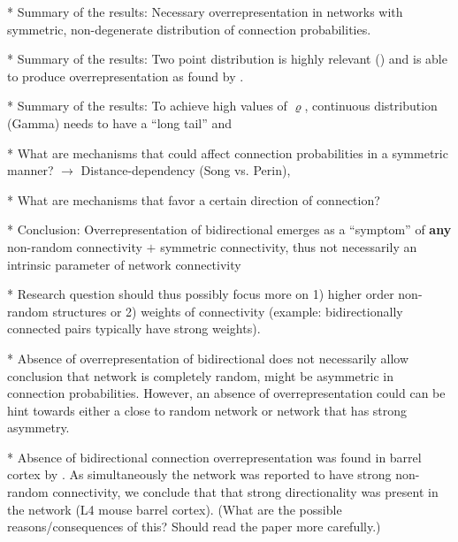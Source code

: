 

* Summary of the results: Necessary overrepresentation in networks with symmetric, non-degenerate distribution of connection probabilities.

* Summary of the results: Two point distribution is highly relevant (\cite{Lee2016}) and is able to produce overrepresentation as found by \cite{Song2005}.

* Summary of the results: To achieve high values of $\varrho$, continuous distribution (Gamma) needs to have a \enquote{long tail} and 

* What are mechanisms that could affect connection probabilities in a symmetric manner? $\rightarrow$ Distance-dependency (Song vs. Perin),

* What are mechanisms that favor a certain direction of connection?

* Conclusion: Overrepresentation of bidirectional emerges as a \enquote{symptom} of \textbf{any} non-random connectivity $+$ symmetric connectivity, thus not necessarily an intrinsic parameter of network connectivity

* Research question should thus possibly focus more on 1) higher order non-random structures or 2) weights of connectivity (example: bidirectionally connected pairs typically have strong weights). 

* Absence of overrepresentation of bidirectional does not necessarily allow conclusion that network is completely random, might be asymmetric in connection probabilities. However, an absence of overrepresentation could can be hint towards either a close to random network or network that has strong asymmetry.

* Absence of bidirectional connection overrepresentation was found in barrel cortex by \cite{Lefort2009}. As simultaneously the network was reported to have strong non-random connectivity, we conclude that that strong directionality was present in the network (L4 mouse barrel cortex). (What are the possible reasons/consequences of this? Should read the paper more carefully.)


